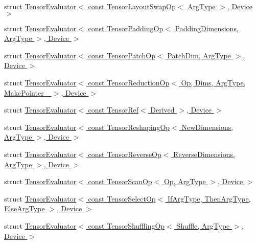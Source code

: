 \begin{DoxyCompactItemize}
struct \hyperlink{struct_eigen_1_1_tensor_evaluator_3_01const_01_tensor_layout_swap_op_3_01_arg_type_01_4_00_01_device_01_4}{Tensor\+Evaluator$<$ const Tensor\+Layout\+Swap\+Op$<$ Arg\+Type $>$, Device $>$}
\item 
struct \hyperlink{struct_eigen_1_1_tensor_evaluator_3_01const_01_tensor_padding_op_3_01_padding_dimensions_00_01_arg_type_01_4_00_01_device_01_4}{Tensor\+Evaluator$<$ const Tensor\+Padding\+Op$<$ Padding\+Dimensions, Arg\+Type $>$, Device $>$}
\item 
struct \hyperlink{struct_eigen_1_1_tensor_evaluator_3_01const_01_tensor_patch_op_3_01_patch_dim_00_01_arg_type_01_4_00_01_device_01_4}{Tensor\+Evaluator$<$ const Tensor\+Patch\+Op$<$ Patch\+Dim, Arg\+Type $>$, Device $>$}
\item 
struct \hyperlink{struct_eigen_1_1_tensor_evaluator_3_01const_01_tensor_reduction_op_3_01_op_00_01_dims_00_01_arg_4fdf2ec1445de4704eb590bc98040dc6}{Tensor\+Evaluator$<$ const Tensor\+Reduction\+Op$<$ Op, Dims, Arg\+Type, Make\+Pointer\+\_\+ $>$, Device $>$}
\item 
struct \hyperlink{struct_eigen_1_1_tensor_evaluator_3_01const_01_tensor_ref_3_01_derived_01_4_00_01_device_01_4}{Tensor\+Evaluator$<$ const Tensor\+Ref$<$ Derived $>$, Device $>$}
\item 
struct \hyperlink{struct_eigen_1_1_tensor_evaluator_3_01const_01_tensor_reshaping_op_3_01_new_dimensions_00_01_arg_type_01_4_00_01_device_01_4}{Tensor\+Evaluator$<$ const Tensor\+Reshaping\+Op$<$ New\+Dimensions, Arg\+Type $>$, Device $>$}
\item 
struct \hyperlink{struct_eigen_1_1_tensor_evaluator_3_01const_01_tensor_reverse_op_3_01_reverse_dimensions_00_01_arg_type_01_4_00_01_device_01_4}{Tensor\+Evaluator$<$ const Tensor\+Reverse\+Op$<$ Reverse\+Dimensions, Arg\+Type $>$, Device $>$}
\item 
struct \hyperlink{struct_eigen_1_1_tensor_evaluator_3_01const_01_tensor_scan_op_3_01_op_00_01_arg_type_01_4_00_01_device_01_4}{Tensor\+Evaluator$<$ const Tensor\+Scan\+Op$<$ Op, Arg\+Type $>$, Device $>$}
\item 
struct \hyperlink{struct_eigen_1_1_tensor_evaluator_3_01const_01_tensor_select_op_3_01_if_arg_type_00_01_then_arg_346b931156fad56ae8aa875afe41cb55}{Tensor\+Evaluator$<$ const Tensor\+Select\+Op$<$ If\+Arg\+Type, Then\+Arg\+Type, Else\+Arg\+Type $>$, Device $>$}
\item 
struct \hyperlink{struct_eigen_1_1_tensor_evaluator_3_01const_01_tensor_shuffling_op_3_01_shuffle_00_01_arg_type_01_4_00_01_device_01_4}{Tensor\+Evaluator$<$ const Tensor\+Shuffling\+Op$<$ Shuffle, Arg\+Type $>$, Device $>$}

\end{DoxyCompactItemize}
